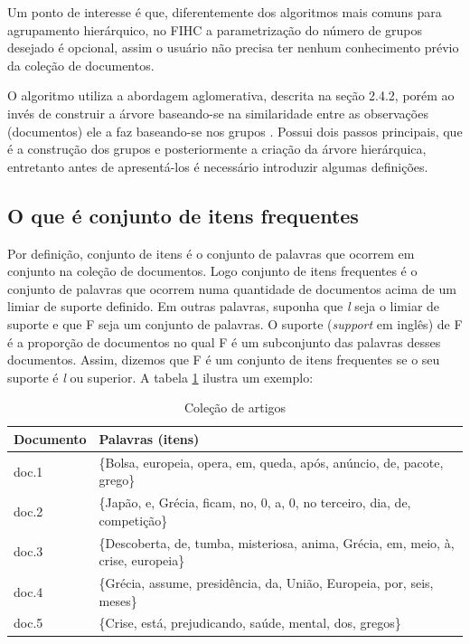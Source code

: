 \documentclass[a4paper,12pt]{article}
\begin{document}
Um ponto de interesse é que, diferentemente dos algoritmos mais comuns para agrupamento hierárquico, no FIHC a parametrização do número de grupos desejado é opcional, assim o usuário não precisa ter nenhum conhecimento prévio da coleção de documentos.

O algoritmo utiliza a abordagem aglomerativa, descrita na seção 2.4.2, porém ao invés de construir a árvore baseando-se na similaridade entre as observações (documentos) ele a faz baseando-se nos grupos \cite{Ester03}. Possui dois passos principais, que é a construção dos grupos e posteriormente a criação da árvore hierárquica, entretanto antes de apresentá-los é necessário introduzir algumas definições.

\subsection {O que é conjunto de itens frequentes}
\label {sec:conjunto_itens_frequentes}

Por definição, conjunto de itens é o conjunto de palavras que ocorrem em conjunto na coleção de documentos. Logo conjunto de itens frequentes é o conjunto de palavras que ocorrem numa quantidade de documentos acima de um limiar de suporte definido. Em outras palavras, suponha que \emph{l} seja o limiar de suporte e que F seja um conjunto de palavras. O suporte (\textit{support} em inglês) de F é a proporção de documentos no qual F é um subconjunto das palavras desses documentos. Assim, dizemos que F é um conjunto de itens frequentes se o seu suporte é \emph{l} ou superior. A tabela \ref{table:colecao_artigos} ilustra um exemplo:

\begin{table}[H]
\centering
\begin{tabular}{ | l | p{10cm} | }
\hline
Documento & Palavras (itens)                                                                   \\ \hline
doc.1     & \{Bolsa, europeia, opera, em, queda, após, anúncio, de, pacote, grego\}            \\ \hline
doc.2     & \{Japão, e, Grécia, ficam, no, 0, a, 0, no terceiro, dia, de, competição\}         \\ \hline
doc.3     & \{Descoberta, de, tumba, misteriosa, anima, Grécia, em, meio, à, crise, europeia\} \\ \hline
doc.4     & \{Grécia, assume, presidência, da, União, Europeia, por, seis, meses\}             \\ \hline
doc.5     &  \{Crise, está, prejudicando, saúde, mental, dos, gregos\} \\
\hline
\end{tabular}
\caption{Coleção de artigos}
\label{table:colecao_artigos}
\end{table}
\end{document}
